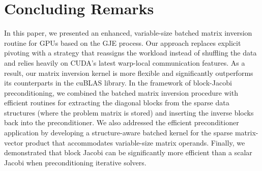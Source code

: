 \section{Concluding Remarks}
\label{sec:s5-summary}
In this paper, we presented an enhanced, variable-size batched matrix inversion routine for
GPUs based on the GJE process. Our approach replaces
explicit pivoting with a strategy that reassigns the workload instead of
shuffling the data and relies heavily on CUDA's latest warp-local communication
features. As a result, our matrix inversion kernel is more flexible and
significantly outperforms its counterparts in the cuBLAS library.
In the framework of block-Jacobi preconditioning, we combined the batched matrix
inversion procedure with efficient routines for extracting the diagonal blocks
from the sparse data structures (where the problem matrix is stored) and inserting
the inverse blocks back into the preconditioner. We also addressed the efficient
preconditioner application
by developing a structure-aware batched kernel for the sparse matrix-vector
product that accommodates variable-size matrix operands. Finally, we
demonstrated that block Jacobi can be significantly more efficient than a scalar
Jacobi when preconditioning iterative solvers.
